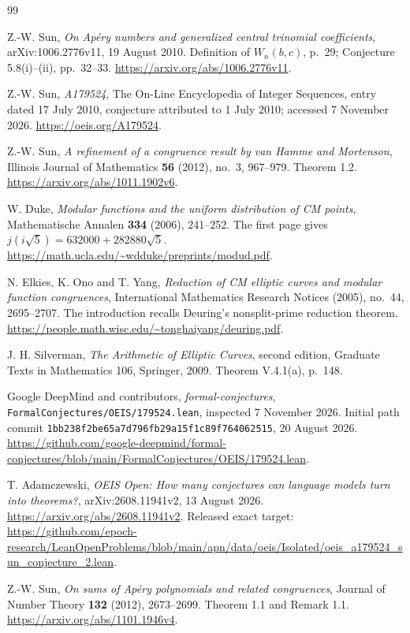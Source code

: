 \documentclass[11pt,a4paper]{article}
\theoremstyle{remark}\newtheorem{remark}[theorem]{Remark}
\begin{document}
\begin{thebibliography}{99}
\raggedright
{}
Z.-W. Sun, \emph{On Ap\'ery numbers and generalized central trinomial
coefficients}, arXiv:1006.2776v11, 19 August 2010.
Definition of \(W_n(b,c)\), p.~29; Conjecture 5.8(i)--(ii), pp.~32--33.
\url{https://arxiv.org/abs/1006.2776v11}.

Z.-W. Sun, \emph{A179524}, The On-Line Encyclopedia of Integer Sequences,
entry dated 17 July 2010, conjecture attributed to 1 July 2010;
accessed 7 November 2026.
\url{https://oeis.org/A179524}.

Z.-W. Sun, \emph{A refinement of a congruence result by van Hamme and
Mortenson}, Illinois Journal of Mathematics \textbf{56} (2012), no.~3,
967--979. Theorem 1.2.
\url{https://arxiv.org/abs/1011.1902v6}.

W. Duke, \emph{Modular functions and the uniform distribution of CM
points}, Mathematische Annalen \textbf{334} (2006), 241--252.
The first page gives \(j(i\sqrt5)=632000+282880\sqrt5\).
\url{https://math.ucla.edu/~wdduke/preprints/modud.pdf}.

N. Elkies, K. Ono and T. Yang, \emph{Reduction of CM elliptic curves and
modular function congruences}, International Mathematics Research
Notices (2005), no.~44, 2695--2707.
The introduction recalls Deuring's nonsplit-prime reduction theorem.
\url{https://people.math.wisc.edu/~tonghaiyang/deuring.pdf}.

J. H. Silverman, \emph{The Arithmetic of Elliptic Curves}, second edition,
Graduate Texts in Mathematics 106, Springer, 2009.
Theorem V.4.1(a), p.~148.

Google DeepMind and contributors, \emph{formal-conjectures},
\texttt{FormalConjectures/OEIS/179524.lean}, inspected 7 November 2026.
Initial path commit \texttt{1bb238f2be65a7d796fb29a15f1c89f764062515},
20 August 2026.
\url{https://github.com/google-deepmind/formal-conjectures/blob/main/FormalConjectures/OEIS/179524.lean}.

T. Adamczewski, \emph{OEIS Open: How many conjectures can language
models turn into theorems?}, arXiv:2608.11941v2, 13 August 2026.
\url{https://arxiv.org/abs/2608.11941v2}.
Released exact target:
\url{https://github.com/epoch-research/LeanOpenProblems/blob/main/apn/data/oeis/Isolated/oeis_a179524_sun_conjecture_2.lean}.

Z.-W. Sun, \emph{On sums of Ap\'ery polynomials and related congruences},
Journal of Number Theory \textbf{132} (2012), 2673--2699.
Theorem 1.1 and Remark 1.1.
\url{https://arxiv.org/abs/1101.1946v4}.


\end{thebibliography}
\end{document}
